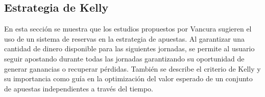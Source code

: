 %
%
%
%

\subsection{Estrategia de Kelly}
\label{subsec:estrategia}

En esta sección se muestra que los estudios propuestos por Vancura \cite{vancura2000finding} sugieren el uso de un sistema de reservas en la estrategia de apuestas. Al garantizar una cantidad de dinero disponible para las siguientes jornadas, se permite al usuario seguir apostando durante todas las jornadas garantizando su oportunidad de generar ganancias o recuperar pérdidas. También se describe el criterio de Kelly \cite{kelly1956new} y su importancia como guía en la optimización del valor esperado de un conjunto de apuestas independientes a través del tiempo.
	
